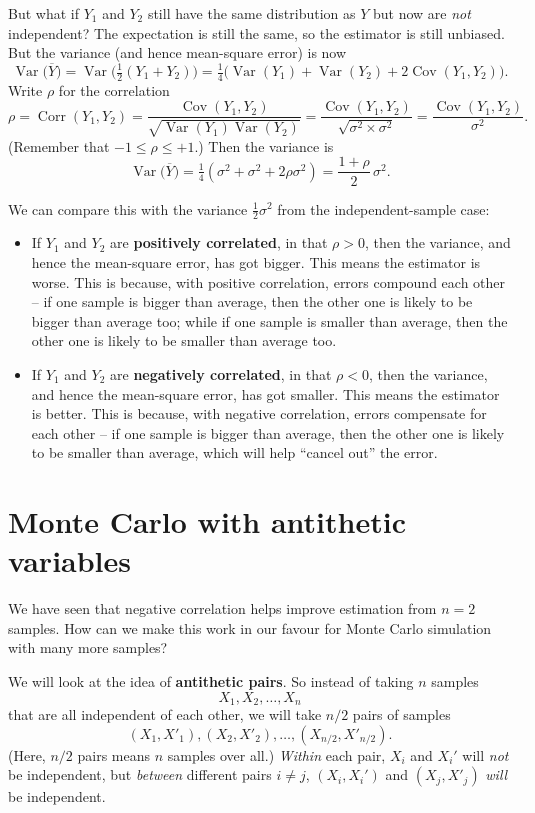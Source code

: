 \documentclass[
  letterpaper,
  DIV=11,
  numbers=noendperiod]{scrreprt}
\newcommand{\Var}{\operatorname{Var}}
\newcommand{\Cov}{\operatorname{Cov}}
\newcommand{\Corr}{\operatorname{Corr}}
\theoremstyle{plain}
\theoremstyle{definition}
\theoremstyle{definition}
\theoremstyle{remark}
\begin{document}
But what if \(Y_1\) and \(Y_2\) still have the same distribution as
\(Y\) but now are \emph{not} independent? The expectation is still the
same, so the estimator is still unbiased. But the variance (and hence
mean-square error) is now
\[ \Var \big( \overline Y\big) = \Var \big(\tfrac12(Y_1 + Y_2)\big) =\tfrac14 \big( \Var(Y_1) + \Var(Y_2) + 2 \Cov(Y_1, Y_2) \big) . \]
Write \(\rho\) for the correlation
\[ \rho = \Corr(Y_1, Y_2) = \frac{\Cov(Y_1, Y_2)}{\sqrt{\Var(Y_1) \Var(Y_2)}} = \frac{\Cov(Y_1, Y_2)}{\sqrt{\sigma^2 \times \sigma^2}} = \frac{\Cov(Y_1, Y_2)}{\sigma^2} . \]
(Remember that \(-1 \leq \rho \leq +1\).) Then the variance is
\[ \Var \big( \overline Y\big) = \tfrac14 ( \sigma^2 + \sigma^2 + 2 \rho \sigma^2 ) = \frac{1+\rho}{2} \,\sigma^2 . \]

We can compare this with the variance \(\frac12 \sigma^2\) from the
independent-sample case:

\begin{itemize}
\item
  If \(Y_1\) and \(Y_2\) are \textbf{positively correlated}, in that
  \(\rho > 0\), then the variance, and hence the mean-square error, has
  got bigger. This means the estimator is worse. This is because, with
  positive correlation, errors compound each other -- if one sample is
  bigger than average, then the other one is likely to be bigger than
  average too; while if one sample is smaller than average, then the
  other one is likely to be smaller than average too.
\item
  If \(Y_1\) and \(Y_2\) are \textbf{negatively correlated}, in that
  \(\rho < 0\), then the variance, and hence the mean-square error, has
  got smaller. This means the estimator is better. This is because, with
  negative correlation, errors compensate for each other -- if one
  sample is bigger than average, then the other one is likely to be
  smaller than average, which will help ``cancel out'' the error.
\end{itemize}

\section{Monte Carlo with antithetic
variables}\label{monte-carlo-with-antithetic-variables}

We have seen that negative correlation helps improve estimation from
\(n=2\) samples. How can we make this work in our favour for Monte Carlo
simulation with many more samples?

We will look at the idea of \textbf{antithetic pairs}. So instead of
taking \(n\) samples \[ X_1, X_2, \dots, X_n \] that are all independent
of each other, we will take \(n/2\) pairs of samples
\[ (X_1, X'_1), (X_2, X'_2), \dots, (X_{n/2}, X'_{n/2}) . \] (Here,
\(n/2\) pairs means \(n\) samples over all.) \emph{Within} each pair,
\(X_i\) and \(X_i'\) will \emph{not} be independent, but \emph{between}
different pairs \(i \neq j\), \((X_i, X_i')\) and \((X_j, X'_j)\)
\emph{will} be independent.
\end{document}
